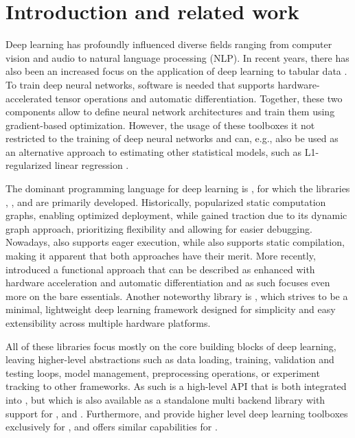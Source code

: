 \documentclass[article]{jss}
\theoremstyle{definition}
\begin{document}
\section{Introduction and related work}

Deep learning has profoundly influenced diverse fields ranging from computer vision and audio to natural language processing (NLP).
In recent years, there has also been an increased focus on the application of deep learning to tabular data \citep{ref-borisov2022deep}.
To train deep neural networks, software is needed that supports hardware-accelerated tensor operations and automatic differentiation.
Together, these two components allow to define neural network architectures and train them using gradient-based optimization.
However, the usage of these toolboxes it not restricted to the training of deep neural networks and can, e.g., also be used as an alternative approach to estimating other statistical models, such as L1-regularized linear regression \citep{ref-kolb2025deep}.

The dominant programming language for deep learning is  \citep{ref-van1995python}, for which the libraries  \citep{ref-abadi2016tensorflow},  \citep{ref-pytorch}, and  \citep{ref-jax2018github} are primarily developed.
Historically,  popularized static computation graphs, enabling optimized deployment, while  gained traction due to its dynamic graph approach, prioritizing flexibility and allowing for easier debugging.
Nowadays,  also supports eager execution, while  also supports static compilation, making it apparent that both approaches have their merit.
More recently,  introduced a functional approach that can be described as  \citep{ref-harris2020array} enhanced with hardware acceleration and automatic differentiation and as such focuses even more on the bare essentials.
Another noteworthy library is  \citep{ref-tinygrad}, which strives to be a minimal, lightweight deep learning framework designed for simplicity and easy extensibility across multiple hardware platforms.

All of these libraries focus mostly on the core building blocks of deep learning, leaving higher-level abstractions such as data loading, training, validation and testing loops, model management, preprocessing operations, or experiment tracking to other frameworks.
As such  \citep{chollet2018keras} is a high-level API that is both integrated into , but which is also available as a standalone multi backend library with support for ,  and . Furthermore,  \citep{ref-lightning2019} and  provide higher level deep learning toolboxes exclusively for , and  \citep{ref-trax} offers similar capabilities for .
\end{document}
